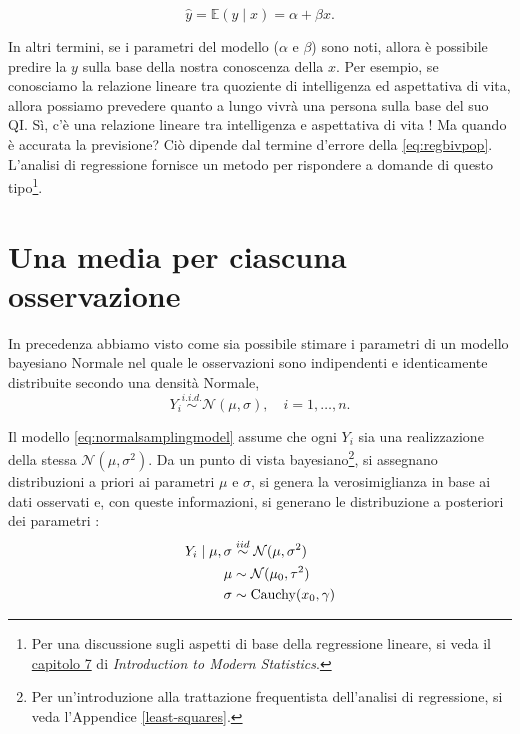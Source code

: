 \documentclass[
  10pt,
  italian,
  a4paper,
  extrafontsizes,onecolumn,openright
  ]{memoir}
\DeclareMathOperator{\Cauchy}{Cauchy} %
\begin{document}
\begin{equation}
\hat{y} = \mathbb{E}(y \mid x) = \alpha + \beta x.
\label{eq:regbivpop2}
\end{equation}

In altri termini, se i parametri del modello (\(\alpha\) e \(\beta\)) sono noti, allora è possibile predire la \(y\) sulla base della nostra conoscenza della \(x\).
Per esempio, se conosciamo la relazione lineare tra quoziente di intelligenza ed aspettativa di vita, allora possiamo prevedere quanto a lungo vivrà una persona sulla base del suo QI. Sì, c'è una relazione lineare tra intelligenza e aspettativa di vita \autocite{hambrick2015research}! Ma quando è accurata la previsione? Ciò dipende dal termine d'errore della \eqref{eq:regbivpop}. L'analisi di regressione fornisce un metodo per rispondere a domande di questo tipo\footnote{Per una discussione sugli aspetti di base della regressione lineare, si veda il \href{https://openintro-ims.netlify.app/model-slr.html}{capitolo 7} di \emph{Introduction to Modern Statistics}.}.

\hypertarget{una-media-per-ciascuna-osservazione}{%
\section{Una media per ciascuna osservazione}\label{una-media-per-ciascuna-osservazione}}

In precedenza abbiamo visto come sia possibile stimare i parametri di un modello bayesiano Normale nel quale le osservazioni sono indipendenti e identicamente distribuite secondo una densità Normale,
\begin{equation}
Y_i \stackrel{i.i.d.}{\sim} \mathcal{N}(\mu, \sigma), \quad i = 1, \dots, n.
\label{eq:normalsamplingmodel}
\end{equation}

Il modello \eqref{eq:normalsamplingmodel} assume che ogni \(Y_i\) sia una realizzazione della stessa \(\mathcal{N}(\mu, \sigma^2)\). Da un punto di vista bayesiano\footnote{Per un'introduzione alla trattazione frequentista dell'analisi di regressione, si veda l'Appendice \ref{least-squares}.}, si assegnano distribuzioni a priori ai parametri \(\mu\) e \(\sigma\), si genera la verosimiglianza in base ai dati osservati e, con queste informazioni, si generano le distribuzione a posteriori dei parametri \autocite{gelman2020regression}:
\begin{align}
Y_i \mid \mu, \sigma & \stackrel{iid}{\sim} \mathcal{N}(\mu, \sigma^2)\notag\\
\mu       & \sim \mathcal{N}(\mu_0, \tau^2) \notag\\
\sigma    & \sim \Cauchy(x_0, \gamma) \notag
\end{align}
\end{document}
